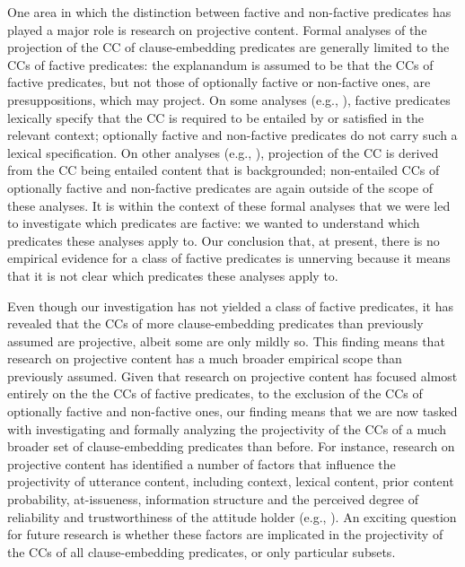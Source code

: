\documentclass[11pt,fleqn]{article}
\newcommand{\6}{\mbox{$[\hspace*{-.6mm}[$}}
\newcommand{\9}{\mbox{$]\hspace*{-.6mm}]$}}
\begin{document}
{One area in which the distinction between factive and non-factive predicates has played a major role is research on projective content. Formal analyses of the projection of the CC of clause-embedding predicates are generally limited to the CCs of factive predicates: the explanandum is assumed to be that the CCs of factive predicates, but not those of optionally factive or non-factive ones, are presuppositions, which may project. On some analyses (e.g., \citealt{heim83,vds92}), factive predicates lexically specify that the CC is required to be entailed by or satisfied in the relevant context; optionally factive and non-factive predicates do not carry such a lexical specification. On other analyses (e.g., \citealt{abrusan2011,abrusan2016,romoli2015,best-question}), projection of the CC is derived from the CC being entailed content that is backgrounded; non-entailed CCs of optionally factive and non-factive predicates are again outside of the scope of these analyses. It is within the context of these formal analyses that we were led to investigate which predicates are factive: we wanted to understand which predicates these analyses apply to. Our conclusion that, at present, there is no empirical evidence for a class of factive predicates is unnerving because it means that it is not clear which predicates these analyses apply to.

Even though our investigation has not yielded a class of factive predicates, it has revealed that the CCs of more clause-embedding predicates than previously assumed are projective, albeit some are only mildly so. This finding means that research on projective content has a much broader empirical scope than previously assumed. Given that research on projective content has focused almost entirely on the the CCs of factive predicates, to the exclusion of the CCs of optionally factive and non-factive ones, our finding means that we are now tasked with investigating and formally analyzing the projectivity of the CCs of a much broader set of clause-embedding predicates than before. For instance, research on projective content has identified a number of factors that influence the projectivity of utterance content, including context, lexical content, prior content probability, at-issueness, information structure and the perceived degree of reliability and trustworthiness of the attitude holder (e.g., \citealt{gazdar79a,gazdar79b,beaver-belly,schlenker10,brst-salt10,best-question,abrusan2011,abrusan2016,anand-hacquard2014,cummins-rohde2015,djaerv-bacovcin-salt27,tonhauser-salt26,tonhauser-guarani-variability,tbd-variability,tonhauser-etal-sub23}). An exciting question for future research is whether these factors are implicated in the projectivity of the CCs of all clause-embedding predicates, or only particular subsets. 

}
\end{document}
